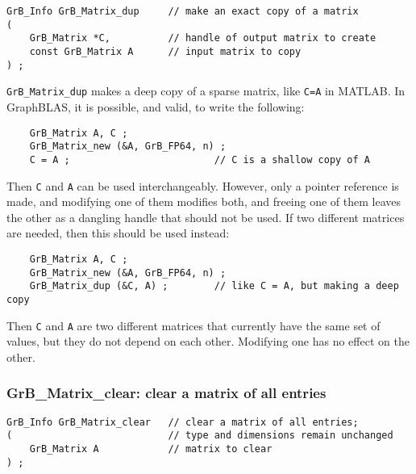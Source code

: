 \documentclass[12pt]{article}
\begin{document}
\begin{mdframed}[userdefinedwidth=6in]
{\footnotesize
\begin{verbatim}
GrB_Info GrB_Matrix_dup     // make an exact copy of a matrix
(
    GrB_Matrix *C,          // handle of output matrix to create
    const GrB_Matrix A      // input matrix to copy
) ;
\end{verbatim} } \end{mdframed}

\verb'GrB_Matrix_dup' makes a deep copy of a sparse matrix, like \verb'C=A' in
MATLAB.  In GraphBLAS, it is possible, and valid, to write the following:

    {\footnotesize
    \begin{verbatim}
    GrB_Matrix A, C ;
    GrB_Matrix_new (&A, GrB_FP64, n) ;
    C = A ;                         // C is a shallow copy of A  \end{verbatim}}

Then \verb'C' and \verb'A' can be used interchangeably.  However, only a
pointer reference is made, and modifying one of them modifies both, and freeing
one of them leaves the other as a dangling handle that should not be used.  If
two different matrices are needed, then this should be used instead:

    {\footnotesize
    \begin{verbatim}
    GrB_Matrix A, C ;
    GrB_Matrix_new (&A, GrB_FP64, n) ;
    GrB_Matrix_dup (&C, A) ;        // like C = A, but making a deep copy \end{verbatim}}

Then \verb'C' and \verb'A' are two different matrices that currently have the
same set of values, but they do not depend on each other.  Modifying one has
no effect on the other.

\subsubsection{{\sf GrB\_Matrix\_clear:}        clear a matrix of all entries}
\label{matrix_clear}

\begin{mdframed}[userdefinedwidth=6in]
{\footnotesize
\begin{verbatim}
GrB_Info GrB_Matrix_clear   // clear a matrix of all entries;
(                           // type and dimensions remain unchanged
    GrB_Matrix A            // matrix to clear
) ;
\end{verbatim} } \end{mdframed}
\end{document}
